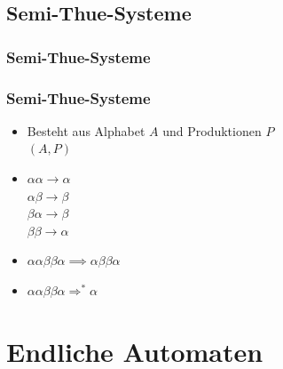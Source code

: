 \subsection{Semi-Thue-Systeme}
\begin{frame}
	\frametitle{Semi-Thue-Systeme}
\end{frame}
\begin{frame}
	\frametitle{Semi-Thue-Systeme}
	\begin{itemize}
		\item Besteht aus Alphabet $A$ und Produktionen $P$ \\ $(A,P)$
		\item $\alpha\alpha \rightarrow \alpha$
		\\ $\alpha\beta \rightarrow \beta$
		\\ $\beta\alpha \rightarrow \beta$
		\\ $\beta\beta \rightarrow \alpha$
		\item $\alpha\alpha\beta\beta\alpha \implies \alpha\beta\beta\alpha$
		\item $\alpha\alpha\beta\beta\alpha \Rightarrow^* \alpha$
	\end{itemize}
\end{frame}
\section{Endliche Automaten}
